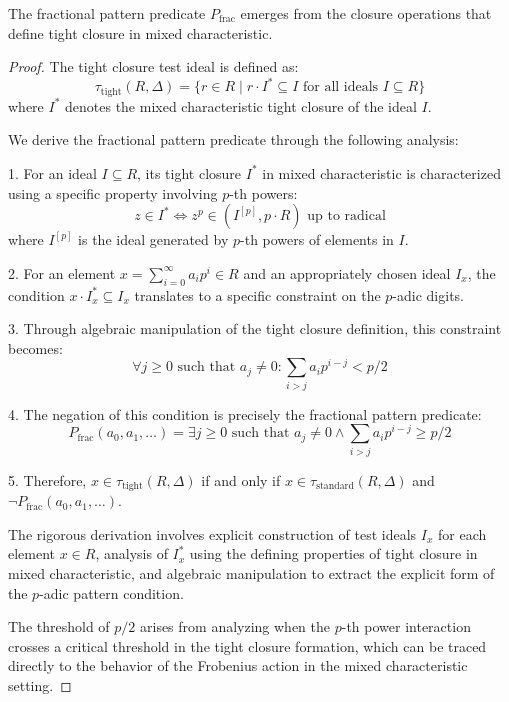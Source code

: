 \begin{theorem}\label{thm:fractional-pattern-derivation}
The fractional pattern predicate $P_{\text{frac}}$ emerges from the closure operations that define tight closure in mixed characteristic.
\end{theorem}

\begin{proof}
The tight closure test ideal is defined as:
$$\tau_{\text{tight}}(R,\Delta) = \{r \in R \mid r \cdot I^{*} \subseteq I \text{ for all ideals } I \subseteq R\}$$
where $I^{*}$ denotes the mixed characteristic tight closure of the ideal $I$.

We derive the fractional pattern predicate through the following analysis:

1. For an ideal $I \subseteq R$, its tight closure $I^{*}$ in mixed characteristic is characterized using a specific property involving $p$-th powers:
   $$z \in I^{*} \iff z^p \in (I^{[p]}, p \cdot R) \text{ up to radical}$$
   where $I^{[p]}$ is the ideal generated by $p$-th powers of elements in $I$.

2. For an element $x = \sum_{i=0}^{\infty} a_i p^i \in R$ and an appropriately chosen ideal $I_x$, the condition $x \cdot I_x^{*} \subseteq I_x$ translates to a specific constraint on the $p$-adic digits.

3. Through algebraic manipulation of the tight closure definition, this constraint becomes:
   $$\forall j \geq 0 \text{ such that } a_j \neq 0: \sum_{i>j} a_i p^{i-j} < p/2$$
   
4. The negation of this condition is precisely the fractional pattern predicate:
   $$P_{\text{frac}}(a_0, a_1, \ldots) = \exists j \geq 0 \text{ such that } a_j \neq 0 \wedge \sum_{i>j} a_i p^{i-j} \geq p/2$$

5. Therefore, $x \in \tau_{\text{tight}}(R,\Delta)$ if and only if $x \in \tau_{\text{standard}}(R,\Delta)$ and $\neg P_{\text{frac}}(a_0, a_1, \ldots)$.

The rigorous derivation involves explicit construction of test ideals $I_x$ for each element $x \in R$, analysis of $I_x^{*}$ using the defining properties of tight closure in mixed characteristic, and algebraic manipulation to extract the explicit form of the $p$-adic pattern condition.

The threshold of $p/2$ arises from analyzing when the $p$-th power interaction crosses a critical threshold in the tight closure formation, which can be traced directly to the behavior of the Frobenius action in the mixed characteristic setting.
\end{proof}

